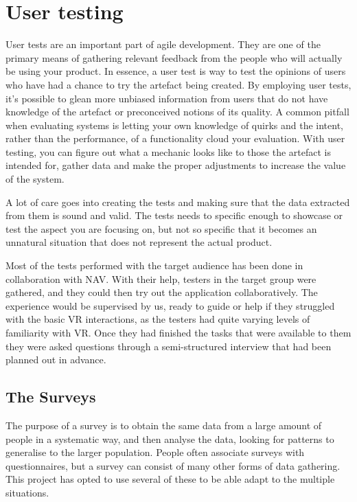 \section{User testing}
User tests are an important part of agile development. They are one of the primary means of gathering relevant feedback from the people who will actually be using your product. In essence, a user test is way to test the opinions of users who have had a chance to try the artefact being created. By employing user tests, it's possible to glean more unbiased information from users that do not have knowledge of the artefact or preconceived notions of its quality. A common pitfall when evaluating systems is letting your own knowledge of quirks and the intent, rather than the performance, of a functionality cloud your evaluation. With user testing, you can figure out what a mechanic looks like to those the artefact is intended for, gather data and make the proper adjustments to increase the value of the system.

A lot of care goes into creating the tests and making sure that the data extracted from them is sound and valid. The tests needs to specific enough to showcase or test the aspect you are focusing on, but not so specific that it becomes an unnatural situation that does not represent the actual product.


Most of the tests performed with the target audience has been done in collaboration with NAV. With their help, testers in the target group were gathered, and they could then try out the application collaboratively. The experience would be supervised by us, ready to guide or help if they struggled with the basic VR interactions, as the testers had quite varying levels of familiarity with VR. Once they had finished the tasks that were available to them they were asked questions through a semi-structured interview that had been planned out in advance.


\subsection{The Surveys}
The purpose of a survey is to obtain the same data from a large amount of people in a systematic way, and then analyse the data, looking for patterns to generalise to the larger population\cite{oates2005researching}. People often associate surveys with questionnaires, but a survey can consist of many other forms of data gathering. This project has opted to use several of these to be able adapt to the multiple situations. 

